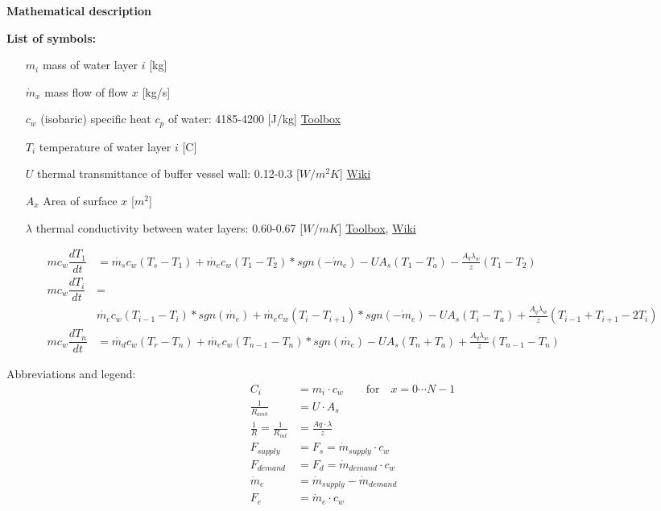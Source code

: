 \textbf{Mathematical description}

\textbf{List of symbols:}

\begin{itemize}
	\item [$m_i$] {mass of water layer $i$ [kg]}
	\item [$\dot{m}_x$] {mass flow of flow $x$ [kg/s]}
	\item [$c_w$] {(isobaric) specific heat $c_p$ of water: 4185-4200 [J/kg]} \href{https://www.engineeringtoolbox.com/specific-heat-capacity-water-d_660.html}{Toolbox}
	\item [$T_i$] {temperature of water layer $i$ [\textdegree C]}
	\item [$U$] {thermal transmittance of buffer vessel wall: 0.12-0.3 [$W/m^2K$]} \href{https://en.wikipedia.org/wiki/Thermal_transmittance}{Wiki}
	\item [$A_x$] {Area of  surface $x$ [\(m^2\)]}
	\item [$\lambda$] {thermal conductivity between water layers: 0.60-0.67 [$W/mK$]} \href{https://www.engineeringtoolbox.com/water-liquid-gas-thermal-conductivity-temperature-pressure-d_2012.html}{Toolbox}, \href{https://en.wikipedia.org/wiki/Thermal_conductivity_and_resistivity}{Wiki}
\end{itemize}

\begin{equation}
	\begin{aligned}
		\label{eq:Buffer vessel layers}
	    mc_w \dfrac{dT_1}{dt} &=
	    \dot{m_s}c_w(T_s - T_1) + \dot{m_e}c_w(T_1 - T_2)*sgn(\dot{-m_e}) - UA_s(T_1 - T_a) - \frac{A_q\lambda_w}{z}(T_1-T_2) \\
	    mc_w \dfrac{dT_i}{dt} &= \\
	    & \dot{m_e}c_w(T_{i-1} - T_{i})*sgn(\dot{m_e}) + \dot{m_e}c_w(T_{i} - T_{i+1})*sgn(\dot{-m_e}) - UA_s(T_i - T_a) + \frac{A_q\lambda_w}{z}(T_{i-1} + T_{i+1} - 2T_i) \\
   	    mc_w \dfrac{dT_n}{dt} &= 
   	    \dot{m_d}c_w(T_r - T_n) + \dot{m_e}c_w(T_{n-1} - T_n)*sgn(\dot{m_e}) - UA_s(T_n + T_a) + \frac{A_q\lambda_w}{z}(T_{n-1}-T_n)		
	\end{aligned}
\end{equation}

Abbreviations and legend:
	\begin{equation}
		\begin{aligned}
			C_i &= m_i \cdot c_{w} \qquad \text{for} \quad x =  0 \cdots N-1 \\
			\frac{1}{R_{amb}} &= U \cdot A_s \\
			\frac{1}{R} = \frac{1}{R_{int}} &= \frac{Aq \cdot \lambda}{z} \\
			F_{supply} &= F_s = \dot{m}_{supply} \cdot c_{w} \\
			F_{demand} &= F_d = \dot{m}_{demand} \cdot c_{w} \\
			\dot{m}_e &= \dot{m}_{supply} - \dot{m}_{demand} \\
			F_e &= \dot{m}_{e} \cdot c_{w} 
		\end{aligned}
	\end{equation}


